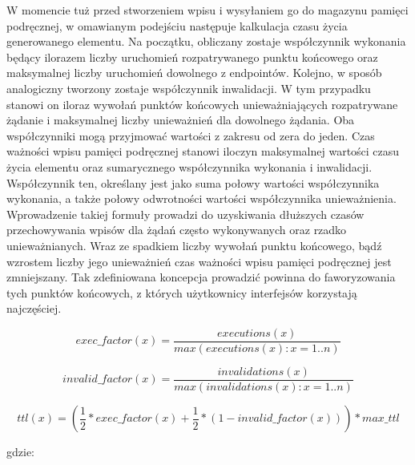 W momencie tuż przed stworzeniem wpisu i wysyłaniem go do magazynu pamięci podręcznej, w omawianym podejściu następuje kalkulacja czasu życia generowanego elementu. Na początku, obliczany zostaje współczynnik wykonania będący ilorazem liczby uruchomień rozpatrywanego punktu końcowego oraz maksymalnej liczby uruchomień dowolnego z endpointów. Kolejno, w sposób analogiczny tworzony zostaje współczynnik inwalidacji. W tym przypadku stanowi on iloraz wywołań punktów końcowych unieważniających rozpatrywane żądanie i maksymalnej liczby unieważnień dla dowolnego żądania. Oba współczynniki mogą przyjmować wartości z zakresu od zera do jeden. Czas ważności wpisu pamięci podręcznej stanowi iloczyn maksymalnej wartości czasu życia elementu oraz sumarycznego współczynnika wykonania i inwalidacji. Współczynnik ten, określany jest jako suma połowy wartości współczynnika wykonania, a także połowy odwrotności wartości współczynnika unieważnienia. Wprowadzenie takiej formuły prowadzi do uzyskiwania dłuższych czasów przechowywania wpisów dla żądań często wykonywanych oraz rzadko unieważnianych. Wraz ze spadkiem liczby wywołań punktu końcowego, bądź wzrostem liczby jego unieważnień czas ważności wpisu pamięci podręcznej jest zmniejszany. Tak zdefiniowana koncepcja prowadzić powinna do faworyzowania tych punktów końcowych, z których użytkownicy interfejsów korzystają najczęściej.

\begin{equation}
    exec\_factor(x) =  \frac{executions(x)}{max(executions(x):x=1..n)}
    \label{eq:execution-factor}
\end{equation}

\begin{equation}
    invalid\_factor(x) =  \frac{invalidations(x)}{max(invalidations(x):x=1..n)}
    \label{eq:invalidation-factor}
\end{equation}

\begin{equation}
    ttl(x) = (\frac{1}{2} * exec\_factor(x) + \frac{1}{2} * (1 - invalid\_factor(x))) * max\_ttl
    \label{eq:time-to-live}
\end{equation}



gdzie:\newline\newline



